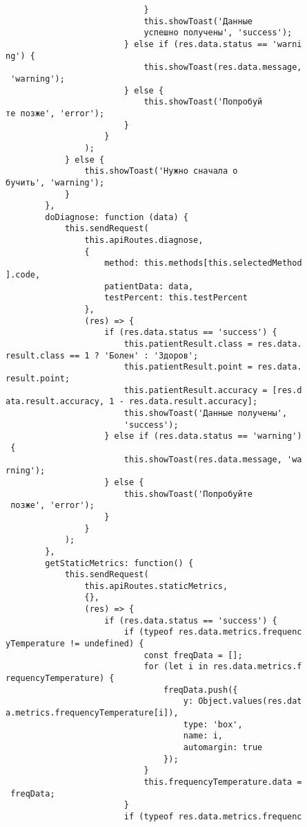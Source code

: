 \begin{verbatim}
                            }                            
                            this.showToast('Данные 
                            успешно получены', 'success');
                        } else if (res.data.status == 'warni
ng') {
                            this.showToast(res.data.message,
 'warning');
                        } else {
                            this.showToast('Попробуй
те позже', 'error');
                        }
                    }
                );
            } else {
                this.showToast('Нужно сначала о
бучить', 'warning');
            }
        },
        doDiagnose: function (data) {
            this.sendRequest(
                this.apiRoutes.diagnose,
                {
                    method: this.methods[this.selectedMethod
].code,
                    patientData: data,
                    testPercent: this.testPercent
                },
                (res) => {
                    if (res.data.status == 'success') {
                        this.patientResult.class = res.data.
result.class == 1 ? 'Болен' : 'Здоров';
                        this.patientResult.point = res.data.
result.point;
                        this.patientResult.accuracy = [res.d
ata.result.accuracy, 1 - res.data.result.accuracy];
                        this.showToast('Данные получены', 
                        'success');
                    } else if (res.data.status == 'warning')
 {
                        this.showToast(res.data.message, 'wa
rning');
                    } else {
                        this.showToast('Попробуйте
 позже', 'error');
                    }
                }
            );
        },
        getStaticMetrics: function() {
            this.sendRequest(
                this.apiRoutes.staticMetrics,
                {},
                (res) => {
                    if (res.data.status == 'success') {
                        if (typeof res.data.metrics.frequenc
yTemperature != undefined) {
                            const freqData = [];
                            for (let i in res.data.metrics.f
requencyTemperature) {
                                freqData.push({
                                    y: Object.values(res.dat
a.metrics.frequencyTemperature[i]),
                                    type: 'box',
                                    name: i,
                                    automargin: true
                                });
                            }
                            this.frequencyTemperature.data =
 freqData;
                        }
                        if (typeof res.data.metrics.frequenc

\end{verbatim}
